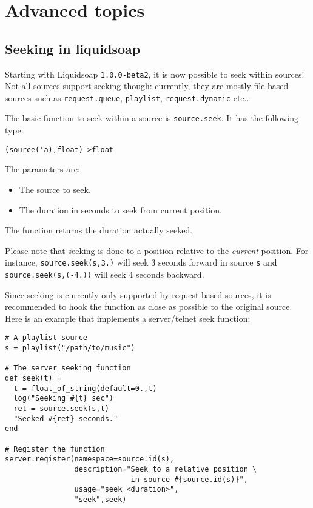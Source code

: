 \chapter{Advanced topics}
\section{Seeking in liquidsoap}
Starting with Liquidsoap \verb+1.0.0-beta2+, it is now possible to seek within sources! 
Not all sources support seeking though: currently, they are mostly file-based sources
such as \verb+request.queue+, \verb+playlist+, \verb+request.dynamic+ etc..

The basic function to seek within a source is \verb+source.seek+. It has the following type:

\begin{verbatim}
(source('a),float)->float
\end{verbatim}
The parameters are:

\begin{itemize}
\item The source to seek.
\item The duration in seconds to seek from current position.

\end{itemize}
The function returns the duration actually seeked.

Please note that seeking is done to a position relative to the \emph{current}
position. For instance, \verb+source.seek(s,3.)+ will seek 3 seconds forward in
source \verb+s+ and \verb+source.seek(s,(-4.))+ will seek 4 seconds backward.

Since seeking is currently only supported by request-based sources, it is recommended
to hook the function as close as possible to the original source. Here is an example
that implements a server/telnet seek function:

\begin{verbatim}
# A playlist source
s = playlist("/path/to/music")

# The server seeking function
def seek(t) =
  t = float_of_string(default=0.,t)
  log("Seeking #{t} sec")
  ret = source.seek(s,t)
  "Seeked #{ret} seconds."
end

# Register the function
server.register(namespace=source.id(s),
                description="Seek to a relative position \
                             in source #{source.id(s)}",
                usage="seek <duration>",
                "seek",seek)
\end{verbatim}
